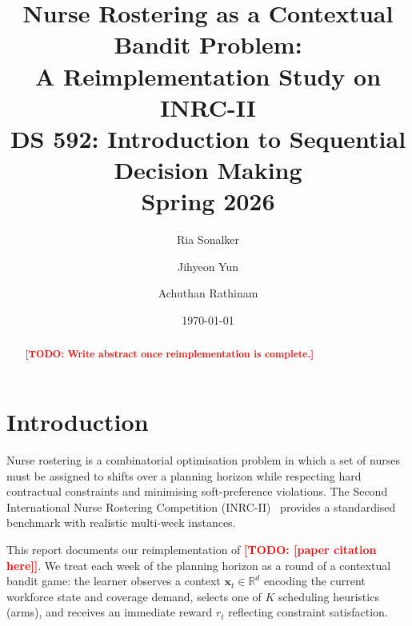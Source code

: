 \documentclass[12pt, a4paper]{article}
\title{
  \vspace{-1cm}
  \Large\textbf{Nurse Rostering as a Contextual Bandit Problem:\\
  A Reimplementation Study on INRC-II}\\[0.5em]
  \normalsize DS 592: Introduction to Sequential Decision Making\\
  Spring 2026
}
\author{
  Ria Sonalker \and Jihyeon Yun \and Achuthan Rathinam
}
\date{\today}
\newcommand{\xt}{\mathbf{x}_t}          %
\newcommand{\reward}{r_t}               %
\newcommand{\TODO}[1]{\textbf{\textcolor{red}{[TODO: #1]}}}
\begin{document}
\maketitle
\thispagestyle{empty}

\begin{abstract}
\noindent
\TODO{Write abstract once reimplementation is complete.}
%
\end{abstract}

\newpage
\tableofcontents
\newpage

\section{Introduction}
\label{sec:intro}

Nurse rostering is a combinatorial optimisation problem in which a set of
nurses must be assigned to shifts over a planning horizon while respecting
hard contractual constraints and minimising soft-preference violations.
The Second International Nurse Rostering Competition (INRC-II)~\cite{inrc2}
provides a standardised benchmark with realistic multi-week instances.

This report documents our reimplementation of \TODO{[paper citation here]}.
We treat each week of the planning horizon as a round of a contextual bandit
game: the learner observes a context $\xt \in \mathbb{R}^d$ encoding the
current workforce state and coverage demand, selects one of $K$ scheduling
heuristics (arms), and receives an immediate reward $\reward$ reflecting
constraint satisfaction.
\end{document}
